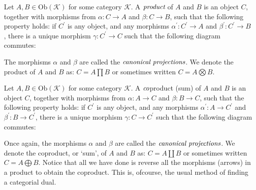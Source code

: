 

Let $A,B \in \text{Ob}(\mathcal{K})$ for some category $\mathcal{K}$.
A $\emph{product}$ of $A$ and $B$ is an object $C$, together with morphisms from
$\alpha: C \to A$ and $\beta: C \to B$, such that the following property holds:
if $C^{'}$ is any object, and any morphisms $\alpha^{'}: C^{'} \to A$ and $\beta^{'}: C^{'} \to B$,
there is a unique morphism $\gamma: C^{'} \to C$ such that the following diagram commutes:


The morphisms $\alpha$ and $\beta$ are called the $\emph{canonical projections}$.
We denote the product of $A$ and $B$ as: $C = A \prod B$ or sometimes written $C = A \bigotimes B$.


Let $A,B \in \text{Ob}(\mathcal{K})$ for some category $\mathcal{K}$.
A $\emph{co}$product (sum) of $A$ and $B$ is an object $C$, together with morphisms from
$\alpha: A \to C$ and $\beta: B \to C$, such that the following property holds:
if $C^{'}$ is any object, and any morphisms $\alpha^{'}: A \to C^{'}$ and $\beta^{'}: B \to C^{'}$,
there is a unique morphism $\gamma: C \to C^{'}$ such that the following diagram commutes:


Once again, the morphisms $\alpha$ and $\beta$ are called the $\emph{canonical projections}$.
We denote the coproduct, or `sum', of $A$ and $B$ as: $C = A \coprod B$ or sometimes written $C = A \bigoplus B$.
Notice that all we have done is reverse all the morphisms (arrows) in a product to obtain the coproduct.
This is, ofcourse, the usual method of finding a categorial dual.
